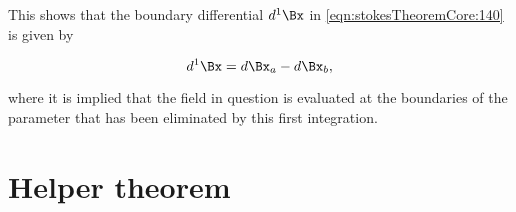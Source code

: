 This shows that the boundary differential \( d^1 \Bx \) in \cref{eqn:stokesTheoremCore:140} is given by

\begin{dmath}\label{eqn:stokesTheoremCore:260}
d^1 \Bx = d\Bx_a - d\Bx_b,
\end{dmath}

where it is implied that the field in question is evaluated at the boundaries of the parameter that has been eliminated by this first integration.

\section{Helper theorem}


